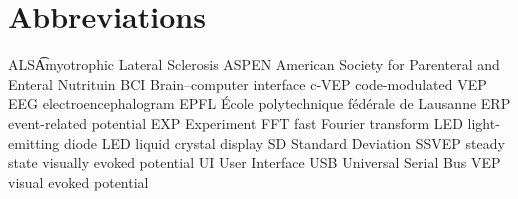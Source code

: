 \chapter{Abbreviations}
ALS\t	Amyotrophic Lateral Sclerosis
ASPEN	American Society for Parenteral and Enteral Nutrituin
BCI	Brain–computer interface
c-VEP	code-modulated VEP
EEG	electroencephalogram
EPFL	École polytechnique fédérale de Lausanne
ERP	event-related potential
EXP	Experiment
FFT	fast Fourier transform
LED	light-emitting diode
LED	liquid crystal display
SD	Standard Deviation
SSVEP	steady state visually evoked potential
UI	User Interface
USB	Universal Serial Bus
VEP	visual evoked potential
